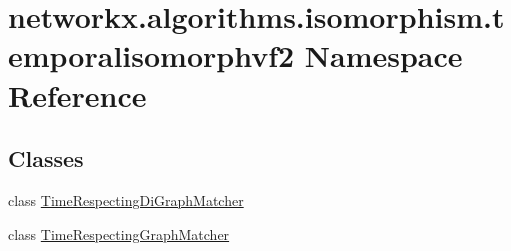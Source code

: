 \hypertarget{namespacenetworkx_1_1algorithms_1_1isomorphism_1_1temporalisomorphvf2}{}\section{networkx.\+algorithms.\+isomorphism.\+temporalisomorphvf2 Namespace Reference}
\label{namespacenetworkx_1_1algorithms_1_1isomorphism_1_1temporalisomorphvf2}
\subsection*{Classes}
\begin{DoxyCompactItemize}
\item 
class \hyperlink{classnetworkx_1_1algorithms_1_1isomorphism_1_1temporalisomorphvf2_1_1TimeRespectingDiGraphMatcher}{Time\+Respecting\+Di\+Graph\+Matcher}
\item 
class \hyperlink{classnetworkx_1_1algorithms_1_1isomorphism_1_1temporalisomorphvf2_1_1TimeRespectingGraphMatcher}{Time\+Respecting\+Graph\+Matcher}
\end{DoxyCompactItemize}


